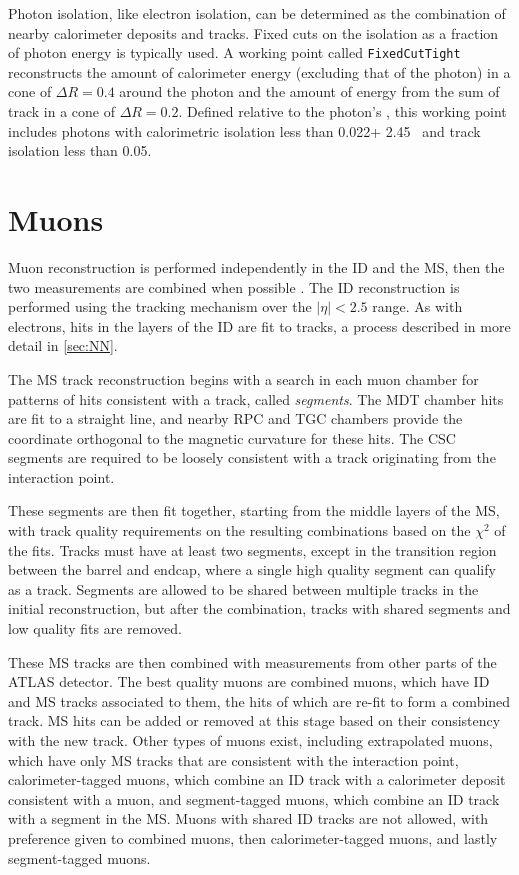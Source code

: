 Photon isolation, like electron isolation, can be determined as the combination of nearby calorimeter deposits and tracks. Fixed cuts on the isolation as a fraction of photon energy is typically used. A working point called \texttt{FixedCutTight} reconstructs the amount of calorimeter energy (excluding that of the photon) in a cone of $\Delta R  = 0.4$ around the photon and the amount of energy from the sum of track \pt in a cone of $\Delta R = 0.2$. Defined relative to the photon's \pt, this working point includes photons with calorimetric isolation less than 0.022\pt + 2.45 \gev~and track isolation less than 0.05\pt \cite{isolation}. 

\section{Muons}
\label{sec:reco_muons}

Muon reconstruction is performed independently in the \ac{ID} and the \ac{MS}, then the two measurements are combined when possible \cite{1603.05598}. The \ac{ID} reconstruction is performed using the tracking mechanism over the $|\eta|<2.5$ range. As with electrons, hits in the layers of the \ac{ID} are fit to tracks, a process described in more detail in \autoref{sec:NN}.

The \ac{MS} track reconstruction begins with a search in each muon chamber for patterns of hits consistent with a track, called \textit{segments}. The \ac{MDT} chamber hits are fit to a straight line, and nearby \ac{RPC} and \ac{TGC} chambers provide the coordinate orthogonal to the magnetic curvature for these hits. The \ac{CSC} segments are required to be loosely consistent with a track originating from the interaction point. 

These segments are then fit together, starting from the middle layers of the \ac{MS}, with track quality requirements on the resulting combinations based on the $\chi^2$ of the fits. Tracks must have at least two segments, except in the transition region between the barrel and endcap, where a single high quality segment can qualify as a track. Segments are allowed to be shared between multiple tracks in the initial reconstruction, but after the combination, tracks with shared segments and low quality fits are removed.    

These \ac{MS} tracks are then combined with measurements from other parts of the ATLAS detector. The best quality muons are combined muons, which have \ac{ID} and \ac{MS} tracks associated to them, the hits of which are re-fit to form a combined track. \ac{MS} hits can be added or removed at this stage based on their consistency with the new track. Other types of muons exist, including extrapolated muons, which have only \ac{MS} tracks that are consistent with the interaction point, calorimeter-tagged muons, which combine an \ac{ID} track with a calorimeter deposit consistent with a muon, and segment-tagged muons, which combine an \ac{ID} track with a segment in the \ac{MS}. Muons with shared \ac{ID} tracks are not allowed, with preference given to combined muons, then calorimeter-tagged muons, and lastly segment-tagged muons. 


